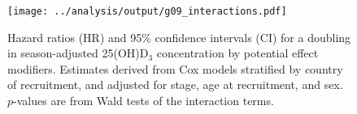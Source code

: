\documentclass[a4paper,10pt]{article}
\begin{document}
\begin{figure}
 \centering
\caption{Hazard ratios (HR) and 95\% confidence intervals (CI) for a 
doubling in season-adjusted 25(OH)D$_3$ concentration by potential effect 
modifiers. \footnotesize{Estimates derived from Cox models stratified by country 
of recruitment, and adjusted for stage, age at recruitment, and sex. $p$-values 
are from Wald tests of the interaction terms.}}
\texttt{[image: ../analysis/output/g09\_interactions.pdf]}
\end{figure}

\end{document}
